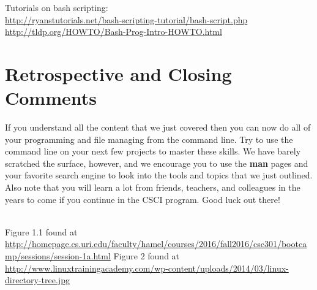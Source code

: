 \documentclass[oneside]{book}
\begin{document}
Tutorials on bash scripting:\\ \url{http://ryanstutorials.net/bash-scripting-tutorial/bash-script.php}\\
\url{http://tldp.org/HOWTO/Bash-Prog-Intro-HOWTO.html}






\newpage

\section{Retrospective and Closing Comments}
    If you understand all the content that we just covered then you can now do all of your programming and file managing from the command line. Try to use the command line on your next few projects to master these skills. We have barely scratched the surface, however, and we encourage you to use the \textbf{man} pages and your favorite search engine to look into the tools and topics that we just outlined. Also note that you will learn a lot from friends, teachers, and colleagues in the years to come if you continue in the CSCI program. Good luck out there!
    \\
    \\

\newpage
\begin{thebibliography}{10}
	 Figure 1.1 found at \url{http://homepage.cs.uri.edu/faculty/hamel/courses/2016/fall2016/csc301/bootcamp/sessions/session-1a.html}
	 Figure 2 found at \url{http://www.linuxtrainingacademy.com/wp-content/uploads/2014/03/linux-directory-tree.jpg}
\end{thebibliography}
\end{document}
